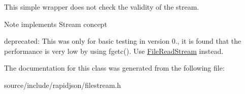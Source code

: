 This simple wrapper does not check the validity of the stream. \begin{DoxyNote}{Note}
implements Stream concept 

deprecated\+: This was only for basic testing in version 0., it is found that the performance is very low by using fgetc(). Use \hyperlink{class_file_read_stream}{File\+Read\+Stream} instead. 
\end{DoxyNote}


The documentation for this class was generated from the following file\+:\begin{DoxyCompactItemize}
\item 
source/include/rapidjson/filestream.\+h\end{DoxyCompactItemize}
